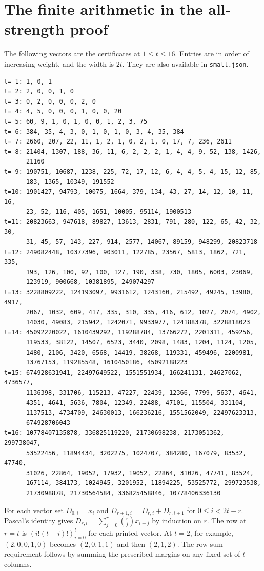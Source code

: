 \documentclass[11pt]{article}
\newcommand{\code}[1]{\texttt{#1}}
\begin{document}
\section{The finite arithmetic in the all-strength proof}
The following vectors are the certificates at \(1\le t\le16\).
Entries are in order of increasing weight, and the width is \(2t\).
They are also available in \code{small.json}.
{\small
\begin{verbatim}
t= 1: 1, 0, 1
t= 2: 2, 0, 0, 1, 0
t= 3: 0, 2, 0, 0, 0, 2, 0
t= 4: 4, 5, 0, 0, 0, 1, 0, 0, 20
t= 5: 60, 9, 1, 0, 1, 0, 0, 1, 2, 3, 75
t= 6: 384, 35, 4, 3, 0, 1, 0, 1, 0, 3, 4, 35, 384
t= 7: 2660, 207, 22, 11, 1, 2, 1, 0, 2, 1, 0, 17, 7, 236, 2611
t= 8: 21404, 1307, 188, 36, 11, 6, 2, 2, 2, 1, 4, 4, 9, 52, 138, 1426,
      21160
t= 9: 190751, 10687, 1238, 225, 72, 17, 12, 6, 4, 4, 5, 4, 15, 12, 85,
      183, 1365, 10349, 191552
t=10: 1901427, 94793, 10075, 1664, 379, 134, 43, 27, 14, 12, 10, 11, 16,
      23, 52, 116, 405, 1651, 10005, 95114, 1900513
t=11: 20823663, 947618, 89827, 13613, 2831, 791, 280, 122, 65, 42, 32, 30,
      31, 45, 57, 143, 227, 914, 2577, 14067, 89159, 948299, 20823718
t=12: 249082448, 10377396, 903011, 122785, 23567, 5813, 1862, 721, 335,
      193, 126, 100, 92, 100, 127, 190, 338, 730, 1805, 6003, 23069,
      123919, 900668, 10381895, 249074297
t=13: 3228809222, 124193097, 9931612, 1243160, 215492, 49245, 13980, 4917,
      2067, 1032, 609, 417, 335, 310, 335, 416, 612, 1027, 2074, 4902,
      14030, 49083, 215942, 1242071, 9933977, 124188378, 3228818023
t=14: 45092220022, 1610439292, 119288784, 13766272, 2201311, 459256,
      119533, 38122, 14507, 6523, 3440, 2098, 1483, 1204, 1124, 1205,
      1480, 2106, 3420, 6568, 14419, 38268, 119331, 459496, 2200981,
      13767153, 119285548, 1610450186, 45092188223
t=15: 674928631941, 22497649522, 1551551934, 166241131, 24627062, 4736577,
      1136398, 331706, 115213, 47227, 22439, 12366, 7799, 5637, 4641,
      4351, 4641, 5636, 7804, 12349, 22488, 47101, 115504, 331104,
      1137513, 4734709, 24630013, 166236216, 1551562049, 22497623313,
      674928706043
t=16: 10778407135878, 336825119220, 21730698238, 2173051362, 299738047,
      53522456, 11894434, 3202275, 1024707, 384280, 167079, 83532, 47740,
      31026, 22864, 19052, 17932, 19052, 22864, 31026, 47741, 83524,
      167114, 384173, 1024945, 3201952, 11894225, 53525772, 299723538,
      2173098878, 21730564584, 336825458846, 10778406336130
\end{verbatim}
}

For each vector set \(D_{0,i}=x_i\) and
\(D_{r+1,i}=D_{r,i}+D_{r,i+1}\) for \(0\le i<2t-r\).
Pascal's identity gives \(D_{r,i}=\sum_{j=0}^{r}\binom rj x_{i+j}\) by
induction on \(r\). The row at \(r=t\) is \((i!(t-i)!)_{i=0}^{t}\)
for each printed vector. At \(t=2\), for example,
\((2,0,0,1,0)\) becomes \((2,0,1,1)\) and then \((2,1,2)\).
The row sum requirement follows by summing the prescribed
margins on any fixed set of \(t\) columns.
\end{document}
